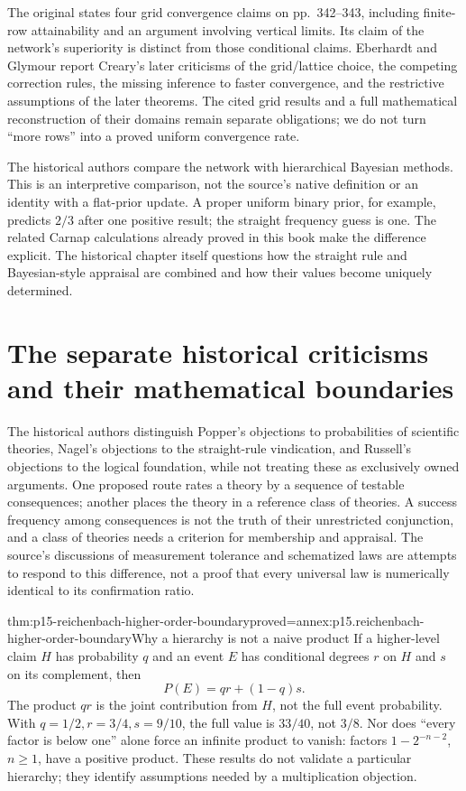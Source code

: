 The original states four grid convergence claims on pp.~342--343,
including finite-row attainability and an argument involving vertical
limits. Its claim of the network's superiority is distinct from those
conditional claims. Eberhardt and Glymour report Creary's later
criticisms of the grid/lattice choice, the competing correction rules,
the missing inference to faster convergence, and the restrictive
assumptions of the later theorems. The cited grid results and a full
mathematical reconstruction of their domains remain separate obligations;
we do not turn ``more rows'' into a proved uniform convergence rate.

The historical authors compare the network with hierarchical Bayesian
methods. This is an interpretive comparison, not the source's native
definition or an identity with a flat-prior update. A proper uniform
binary prior, for example, predicts \(2/3\) after one positive result;
the straight frequency guess is one. The related Carnap calculations
already proved in this book make the difference explicit. The historical
chapter itself questions how the straight rule and Bayesian-style
appraisal are combined and how their values become uniquely determined.

\section{The separate historical criticisms and their mathematical boundaries}
\label{sec:p15-reichenbach-historical-criticism}

The historical authors distinguish Popper's objections to probabilities
of scientific theories, Nagel's objections to the straight-rule
vindication, and Russell's objections to the logical foundation, while
not treating these as exclusively owned arguments. One proposed route
rates a theory by a sequence of testable consequences; another places
the theory in a reference class of theories. A success frequency among
consequences is not the truth of their unrestricted conjunction, and
a class of theories needs a criterion for membership and appraisal.
The source's discussions of measurement tolerance and schematized laws
are attempts to respond to this difference, not a proof that every
universal law is numerically identical to its confirmation ratio.

\begin{hbtheorem}{thm:p15-reichenbach-higher-order-boundary}{proved=annex:p15.reichenbach-higher-order-boundary}{Why a hierarchy is not a naive product}
If a higher-level claim \(H\) has probability \(q\) and an
event \(E\) has conditional degrees \(r\) on \(H\) and
\(s\) on its complement, then
\[
 P(E)=qr+(1-q)s.
\]
The product \(qr\) is the joint contribution from \(H\), not
the full event probability. With \(q=1/2,r=3/4,s=9/10\),
the full value is \(33/40\), not \(3/8\).
Nor does ``every factor is below one'' alone force an infinite product
to vanish: factors \(1-2^{-n-2}\), \(n\geq1\), have a positive
product. These results do not validate a particular hierarchy; they
identify assumptions needed by a multiplication objection.
\end{hbtheorem}

